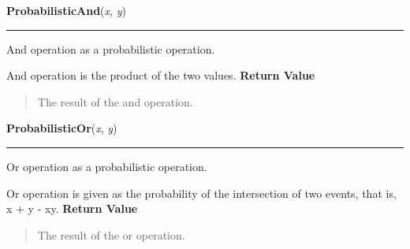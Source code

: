     \label{peach:fuzzy:norms:ProbabilisticAnd}

    \vspace{0.5ex}

\hspace{.8\funcindent}\begin{boxedminipage}{\funcwidth}

    \raggedright \textbf{ProbabilisticAnd}(\textit{x}, \textit{y})

    \vspace{-1.5ex}

    \rule{\textwidth}{0.5\fboxrule}
\setlength{\parskip}{2ex}

And operation as a probabilistic operation.

And operation is the product of the two values.
\setlength{\parskip}{1ex}
      \textbf{Return Value}
    \vspace{-1ex}

      \begin{quote}

The result of the and operation.
      \end{quote}

    \end{boxedminipage}

    \label{peach:fuzzy:norms:ProbabilisticOr}

    \vspace{0.5ex}

\hspace{.8\funcindent}\begin{boxedminipage}{\funcwidth}

    \raggedright \textbf{ProbabilisticOr}(\textit{x}, \textit{y})

    \vspace{-1.5ex}

    \rule{\textwidth}{0.5\fboxrule}
\setlength{\parskip}{2ex}

Or operation as a probabilistic operation.

Or operation is given as the probability of the intersection of two events,
that is, x + y - xy.
\setlength{\parskip}{1ex}
      \textbf{Return Value}
    \vspace{-1ex}

      \begin{quote}

The result of the or operation.
      \end{quote}

    \end{boxedminipage}

